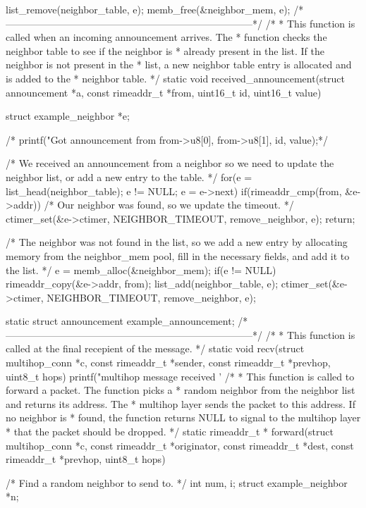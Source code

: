 \begin{DoxyCodeInclude}
{  list_remove(neighbor_table, e);
  memb_free(&neighbor_mem, e);
}
/*---------------------------------------------------------------------------*/
/*
 * This function is called when an incoming announcement arrives. The
 * function checks the neighbor table to see if the neighbor is
 * already present in the list. If the neighbor is not present in the
 * list, a new neighbor table entry is allocated and is added to the
 * neighbor table.
 */
static void
received_announcement(struct announcement *a,
                      const rimeaddr_t *from,
                      uint16_t id, uint16_t value)
{
  struct example_neighbor *e;

  /*  printf("Got announcement from %
      from->u8[0], from->u8[1], id, value);*/

  /* We received an announcement from a neighbor so we need to update
     the neighbor list, or add a new entry to the table. */
  for(e = list_head(neighbor_table); e != NULL; e = e->next) {
    if(rimeaddr_cmp(from, &e->addr)) {
      /* Our neighbor was found, so we update the timeout. */
      ctimer_set(&e->ctimer, NEIGHBOR_TIMEOUT, remove_neighbor, e);
      return;
    }
  }

  /* The neighbor was not found in the list, so we add a new entry by
     allocating memory from the neighbor_mem pool, fill in the
     necessary fields, and add it to the list. */
  e = memb_alloc(&neighbor_mem);
  if(e != NULL) {
    rimeaddr_copy(&e->addr, from);
    list_add(neighbor_table, e);
    ctimer_set(&e->ctimer, NEIGHBOR_TIMEOUT, remove_neighbor, e);
  }
}
static struct announcement example_announcement;
/*---------------------------------------------------------------------------*/
/*
 * This function is called at the final recepient of the message.
 */
static void
recv(struct multihop_conn *c, const rimeaddr_t *sender,
     const rimeaddr_t *prevhop,
     uint8_t hops)
{
  printf("multihop message received '%
}
/*
 * This function is called to forward a packet. The function picks a
 * random neighbor from the neighbor list and returns its address. The
 * multihop layer sends the packet to this address. If no neighbor is
 * found, the function returns NULL to signal to the multihop layer
 * that the packet should be dropped.
 */
static rimeaddr_t *
forward(struct multihop_conn *c,
        const rimeaddr_t *originator, const rimeaddr_t *dest,
        const rimeaddr_t *prevhop, uint8_t hops)
{
  /* Find a random neighbor to send to. */
  int num, i;
  struct example_neighbor *n;

}
\end{DoxyCodeInclude}
